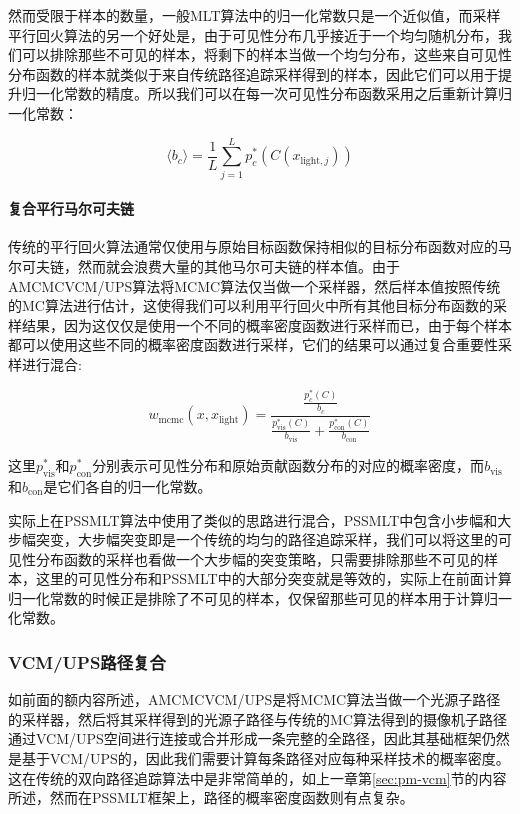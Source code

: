 然而受限于样本的数量，一般MLT算法中的归一化常数只是一个近似值，而采样平行回火算法的另一个好处是，由于可见性分布几乎接近于一个均匀随机分布，我们可以排除那些不可见的样本，将剩下的样本当做一个均匀分布，这些来自可见性分布函数的样本就类似于来自传统路径追踪采样得到的样本，因此它们可以用于提升归一化常数的精度。所以我们可以在每一次可见性分布函数采用之后重新计算归一化常数：

\begin{equation}
	\langle b_c\rangle=\frac{1}{L}\sum^{L}_{j=1}p^{*}_c(C({x}_{\text{light},j}))
\end{equation}




\paragraph{复合平行马尔可夫链}
传统的平行回火算法通常仅使用与原始目标函数保持相似的目标分布函数对应的马尔可夫链，然而就会浪费大量的其他马尔可夫链的样本值。由于AMCMCVCM/UPS算法将MCMC算法仅当做一个采样器，然后样本值按照传统的MC算法进行估计，这使得我们可以利用平行回火中所有其他目标分布函数的采样结果，因为这仅仅是使用一个不同的概率密度函数进行采样而已，由于每个样本都可以使用这些不同的概率密度函数进行采样，它们的结果可以通过复合重要性采样进行混合:

\begin{equation}
	w_{\text{mcmc}}(x,{x}_{\text{light}})=\frac{\frac{p^{*}_c(C)}{b_c}}{\frac{p^{*}_{\text{vis}}(C)}{b_{\text{vis}}}+\frac{p^{*}_{\text{con}}(C)}{b_{\text{con}}}}
\end{equation}

\noindent 这里$p^{*}_{\text{vis}}$和$p^{*}_{\text{con}}$分别表示可见性分布和原始贡献函数分布的对应的概率密度，而$b_{\text{vis}}$和$b_{\text{con}}$是它们各自的归一化常数。

实际上在PSSMLT算法\cite{a:ASimpleandRobustMutationStrategyfortheMetropolisLightTransportAlgorithm}中使用了类似的思路进行混合，PSSMLT中包含小步幅和大步幅突变，大步幅突变即是一个传统的均匀的路径追踪采样，我们可以将这里的可见性分布函数的采样也看做一个大步幅的突变策略，只需要排除那些不可见的样本，这里的可见性分布和PSSMLT中的大部分突变就是等效的，实际上在前面计算归一化常数的时候正是排除了不可见的样本，仅保留那些可见的样本用于计算归一化常数。




\subsubsection{VCM/UPS路径复合}
如前面的额内容所述，AMCMCVCM/UPS是将MCMC算法当做一个光源子路径的采样器，然后将其采样得到的光源子路径与传统的MC算法得到的摄像机子路径通过VCM/UPS空间进行连接或合并形成一条完整的全路径，因此其基础框架仍然是基于VCM/UPS的，因此我们需要计算每条路径对应每种采样技术的概率密度。这在传统的双向路径追踪算法中是非常简单的，如上一章第\ref{sec:pm-vcm}节的内容所述，然而在PSSMLT框架上，路径的概率密度函数则有点复杂。

